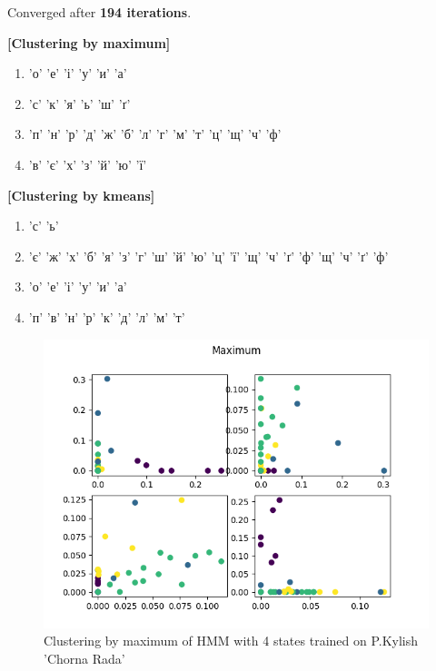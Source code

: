 \documentclass[12pt,a4paper]{article}
\begin{document}
  Converged after \textbf{194 iterations}.

  \textbf{[Clustering by maximum]}
  \begin{enumerate}
    \item 'о' 'е' 'і' 'у' 'и' 'а'
    \item 'с' 'к' 'я' 'ь' 'ш' 'ґ'
    \item 'п' 'н' 'р' 'д' 'ж' 'б' 'л' 'г' 'м' 'т' 'ц' 'щ' 'ч' 'ф'
    \item 'в' 'є' 'х' 'з' 'й' 'ю' 'ї'
  \end{enumerate}

  \textbf{[Clustering by kmeans]}
  \begin{enumerate}
    \item 'с' 'ь'
    \item 'є' 'ж' 'х' 'б' 'я' 'з' 'г' 'ш' 'й' 'ю' 'ц' 'ї' 'щ' 'ч' 'ґ' 'ф'
 'щ' 'ч' 'ґ' 'ф'
    \item 'о' 'е' 'і' 'у' 'и' 'а'
    \item 'п' 'в' 'н' 'р' 'к' 'д' 'л' 'м' 'т'
  \end{enumerate}

  \begin{figure}[h]
    \includegraphics[width=\textwidth]{../plots/kylish-chorna-rada-without-spaces-clustering-4-max-1671021934.9575694.png}
    \centering
    \caption{Clustering by maximum of HMM with 4 states trained on P.Kylish 'Chorna Rada'}
  \end{figure}
\end{document}
